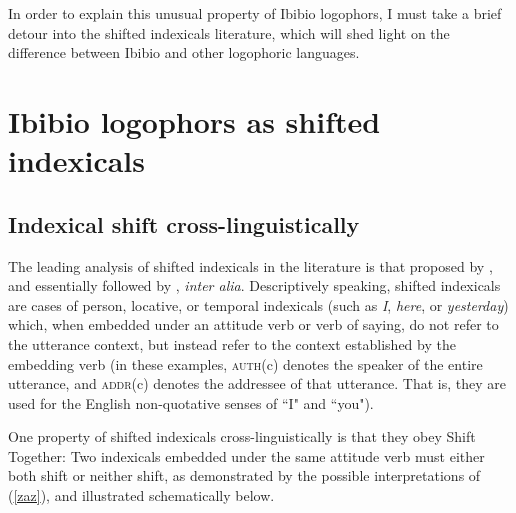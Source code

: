 \documentclass[output=paper]{langscibook}
\begin{document}
In order to explain this unusual property of Ibibio logophors, I must take a brief detour into the shifted indexicals literature, which will shed light on the difference between Ibibio and other logophoric languages.



\section{Ibibio logophors as shifted indexicals}


\subsection{Indexical shift cross-linguistically}

The leading analysis of shifted indexicals in the literature is that proposed by \citet{Anand2006}, and essentially followed by \citet{Sudo2012,Shklovsky2014,Deal2017}, \textit{inter alia}. Descriptively speaking, shifted indexicals are cases of person, locative, or temporal indexicals (such as \textit{I}, \textit{here}, or \textit{yesterday}) which, when embedded under an attitude verb or verb of saying, do not refer to the utterance context, but instead refer to the context established by the embedding verb (in these examples, \textsc{auth}(c) denotes the speaker of the entire utterance, and \textsc{addr}(c) denotes the addressee of that utterance. That is, they are used for the English non-quotative senses of ``I" and ``you").
\begin{exe}
	\label{zaz}
\end{exe}
One property of shifted indexicals cross-linguistically is that they obey Shift Together: Two indexicals embedded under the same attitude verb must either both shift or neither shift, as demonstrated by the possible interpretations of (\ref{zaz}), and illustrated schematically below.
\end{document}
